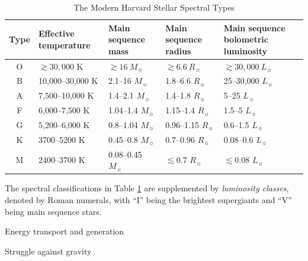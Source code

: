 \begin{table}[hbt]
  \caption{The Modern Harvard Stellar Spectral Types}\label{t.spectralclass}
  \begin{tabular}{c|p{}p{}p{}p{}}
  \hline
  Type & Effective temperature & Main sequence mass & Main sequence radius & Main sequence bolometric luminosity \\
  \hline\hline
  O & $\gtrsim30,000$ K & $\gtrsim16\ M_\sun$ & $\gtrsim6.6\ R_\sun$ & $\gtrsim30,000\ L_\sun$ \\
  B & 10,000--30,000 K & 2.1--16 $M_\sun$ & 1.8--6.6 $R_\sun$ & 25--30,000 $L_\sun$ \\
  A & 7,500--10,000 K & 1.4--2.1 $M_\sun$ & 1.4--1.8 $R_\sun$ & 5--25 $L_\sun$ \\
  F & 6,000--7,500 K & 1.04--1.4 $M_\sun$ & 1.15--1.4 $R_\sun$ & 1.5--5 $L_\sun$ \\
  G & 5,200--6,000 K & 0.8--1.04 $M_\sun$ & 0.96--1.15 $R_\sun$ & 0.6--1.5 $L_\sun$ \\
  K & 3700--5200 K & 0.45--0.8 $M_\sun$ & 0.7--0.96 $R_\sun$ & 0.08--0.6 $L_\sun$ \\
  M & 2400--3700 K & 0.08--0.45 $M_\sun$ & $\lesssim$0.7 $R_\sun$ & $\lesssim$0.08 $L_\sun$ \\
  \hline
  \end{tabular}
\end{table}

The spectral classifications in Table \ref{t.spectralclass} are supplemented by {\it luminosity classes}, denoted by Roman numerals, with ``I'' being the brightest supergiants and ``V'' being main sequence stars. 





  Energy transport and generation

  Struggle against gravity
